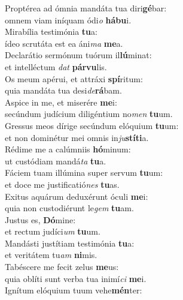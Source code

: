 \evenverse Proptérea ad ómnia mandáta tua diri\textbf{gé}bar:~\*\\
\evenverse omnem viam iníquam ódi\textit{o} \textbf{há}\textbf{bu}i.\\
\oddverse Mirabília testimónia \textbf{tu}a:~\*\\
\oddverse ídeo scrutáta est ea áni\textit{ma} \textbf{me}a.\\
\evenverse Declarátio sermónum tuórum il\textbf{lú}minat:~\*\\
\evenverse et intelléctum \textit{dat} \textbf{pár}\textbf{vu}lis.\\
\oddverse Os meum apérui, et attráxi \textbf{spí}ritum:~\*\\
\oddverse quia mandáta tua desi\textit{de}\textbf{rá}bam.\\
\evenverse Aspice in me, et miserére \textbf{me}i:~\*\\
\evenverse secúndum judícium diligéntium no\textit{men} \textbf{tu}um.\\
\oddverse Gressus meos dírige secúndum elóquium \textbf{tu}um:~\*\\
\oddverse et non dominétur mei omnis in\textit{ju}\textbf{stí}\textbf{ti}a.\\
\evenverse Rédime me a calúmniis \textbf{hó}minum:~\*\\
\evenverse ut custódiam mandá\textit{ta} \textbf{tu}a.\\
\oddverse Fáciem tuam illúmina super servum \textbf{tu}um:~\*\\
\oddverse et doce me justificatió\textit{nes} \textbf{tu}as.\\
\evenverse Exitus aquárum deduxérunt óculi \textbf{me}i:~\*\\
\evenverse quia non custodiérunt le\textit{gem} \textbf{tu}am.\\
\oddverse Justus es, \textbf{Dó}mine:~\*\\
\oddverse et rectum judíci\textit{um} \textbf{tu}um.\\
\evenverse Mandásti justítiam testimónia \textbf{tu}a:~\*\\
\evenverse et veritátem tu\textit{am} \textbf{ni}mis.\\
\oddverse Tabéscere me fecit zelus \textbf{me}us:~\*\\
\oddverse quia oblíti sunt verba tua inimí\textit{ci} \textbf{me}i.\\
\evenverse Ignítum elóquium tuum vehe\textbf{mén}ter:~\*\\
